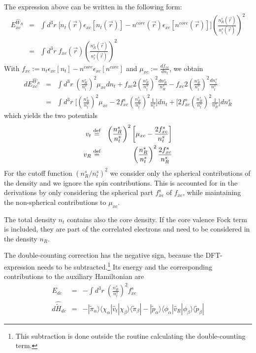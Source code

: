 \documentclass[11pt,a4paper]{report}
\begin{document}
The expression above can be written in the
following form:
\begin{eqnarray}
E_{xc}^{\hat{W}_R}&=&
\int d^3r\; 
\biggl[
n_t(\vec{r})
\epsilon_{xc}[n_t(\vec{r})]
-n^{core}(\vec{r})
\epsilon_{xc}[n^{core}(\vec{r})]
\biggr]
\left(\frac{n^s_R(\vec{r})}{n^s_t(\vec{r})}\right)^2
\nonumber\\
&=&
\int d^3r\; f_{xc}(\vec{r})
\left(\frac{n^s_R(\vec{r})}{n^s_t(\vec{r})}\right)^2
\end{eqnarray}
With $f_{xc}:=n_t\epsilon_{xc}[n_t]-n^{core}\epsilon_{xc}[n^{core}]$ and
$\mu_{xc}:=\frac{df_{xc}}{dn_t}$, we obtain
\begin{eqnarray}
dE_{xc}^{\hat{W}_R}
&=&\int d^3r\; 
\left(\frac{n^s_R}{n^s_t}\right)^2\mu_{xc} dn_t
+f_{xc}2\left(\frac{n^s_R}{n^s_t}\right)^2\frac{dn^s_R}{n^s_R}
-f_{xc}2\left(\frac{n^s_R}{n^s_t}\right)^2\frac{dn^s_t}{n^s_t}
\nonumber\\
&=&\int d^3r\; 
\biggl[
\left(\frac{n^s_R}{n^s_t}\right)^2\mu_{xc} 
-2f^s_{xc}\left(\frac{n^s_R}{n^s_t}\right)^2\frac{1}{n^s_t}\biggr]dn_t
+\biggl[2f^s_{xc}\left(\frac{n^s_R}{n^s_t}\right)^2\frac{1}{n^s_R}\biggr] dn^s_R
\end{eqnarray}
which yields the two potentials
\begin{eqnarray}
v_t&\stackrel{\text{def}}{=}&\left(\frac{n^s_R}{n^s_t}\right)^2
\biggl[\mu_{xc} -\frac{2f^s_{xc}}{n^s_t}\biggr]
\nonumber\\
v_R&\stackrel{\text{def}}{=}&\left(\frac{n^s_R}{n^s_t}\right)^2\frac{2f^s_{xc}}{n^s_R}
\end{eqnarray}
For the cutoff function $(n^s_R/n^s_t)^2$ we consider only the
spherical contributions of the density and we ignore the spin
contributions. This is accounted for in the derivations by only
considering the spherical part $f^s_{xc}$ of $f_{xc}$, while
maintaining the non-spherical contributions to $\mu_{xc}$.

The total density $n_t$ contains also the core density. If the core
valence Fock term is included, they are part of the correlated
electrons and need to be considered in the density $n_R$.

The double-counting correction has the negative sign, because the
DFT-expression needs to be subtracted.\footnote{This subtraction is
  done outside the routine calculating the double-counting term.}  Its
energy and the corresponding contributions to the auxiliary
Hamiltonian are
\begin{eqnarray}
E_{dc}&=&-\int d^3r\; \left(\frac{n^s_R}{n^s_t}\right)^2f^s_{xc}
\nonumber\\
d\hat{\tilde{H}}_{dc}&=&
-|\tilde{\pi}_\alpha\rangle\langle\chi_\alpha|\hat{v}_t|\chi_\beta\rangle
\langle\tilde{\pi}_\beta|
-|\tilde{p}_\alpha\rangle
\langle\phi_\alpha|\hat{v}_R|\phi_\beta\rangle
\langle\tilde{p}_\beta|
\end{eqnarray}
\end{document}
